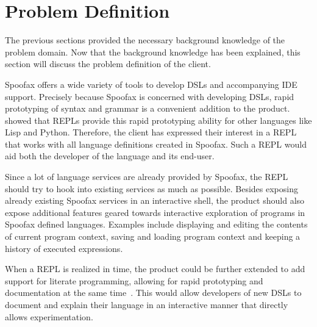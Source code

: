 \section{Problem Definition}
\label{sec:problem-definition}

The previous sections provided the necessary background knowledge of
the problem domain. Now that the background knowledge has been
explained, this section will discuss the problem definition of the
client.

Spoofax offers a wide variety of tools to develop DSLs and
accompanying IDE support. Precisely because Spoofax is concerned with
developing DSLs, rapid prototyping of syntax and grammar is a
convenient addition to the product.  showed that REPLs
provide this rapid prototyping ability for other languages like Lisp
and Python. Therefore, the client has expressed their interest in
a REPL that works with all language definitions created in
Spoofax. Such a REPL would aid both the developer of the language and
its end-user.

Since a lot of language services are already provided by Spoofax, the
REPL should try to hook into existing services as much as possible.
Besides exposing already existing Spoofax services in an interactive
shell, the product should also expose additional features geared
towards interactive exploration of programs in Spoofax defined
languages.  Examples include displaying and editing the contents of
current program context, saving and loading program context and
keeping a history of executed expressions.

When a REPL is realized in time, the product could be further extended to add
support for literate programming, allowing for rapid prototyping and
documentation at the same time~\cite{schulte2012}. This would allow
developers of new DSLs to document and explain their language in an
interactive manner that directly allows experimentation.

